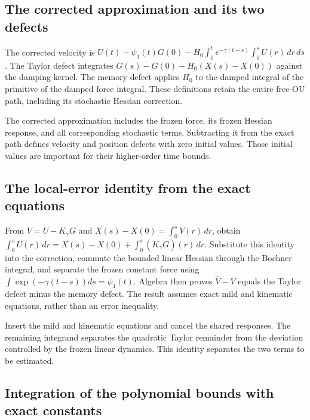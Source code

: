 \documentclass[11pt,a4paper]{report}
\begin{document}
\subsection{\texorpdfstring{The corrected approximation and its two defects}{The corrected approximation and its two defects}}
\label{report-step-KineticLangevin-SecondOrderLocal-lean-2}


The corrected velocity is \(U(t)-\psi_1(t)G(0)-H_0\int_0^t e^{-\gamma(t-s)}\int_0^s U(r)\,dr\,ds\). The Taylor defect integrates \(G(s)-G(0)-H_{0}(X(s)-X(0))\) against the damping kernel. The memory defect applies \(H_{0}\) to the damped integral of the primitive of the damped force integral. These definitions retain the entire free-OU path, including its stochastic Hessian correction.



The corrected approximation includes the frozen force, its frozen Hessian response, and all corresponding stochastic terms. Subtracting it from the exact path defines velocity and position defects with zero initial values. Those initial values are important for their higher-order time bounds.

\subsection{\texorpdfstring{The local-error identity from the exact equations}{The local-error identity from the exact equations}}
\label{report-step-KineticLangevin-SecondOrderLocal-lean-3}


From \(V=U-K_\gamma G\) and \(X(s)-X(0)=\int_0^sV(r)\,dr\), obtain \(\int_0^s U(r)\,dr=X(s)-X(0)+\int_0^s(K_\gamma G)(r)\,dr\). Substitute this identity into the correction, commute the bounded linear Hessian through the Bochner integral, and separate the frozen constant force using \(\int \exp(-\gamma (t-s))ds=\psi _{1}(t)\). Algebra then proves \(\widehat V-V\) equals the Taylor defect minus the memory defect. The result assumes exact mild and kinematic equations, rather than an error inequality.



Insert the mild and kinematic equations and cancel the shared responses. The remaining integrand separates the quadratic Taylor remainder from the deviation controlled by the frozen linear dynamics. This identity separates the two terms to be estimated.

\subsection{\texorpdfstring{Integration of the polynomial bounds with exact constants}{Integration of the polynomial bounds with exact constants}}
\label{report-step-KineticLangevin-SecondOrderLocal-lean-4}
\end{document}
